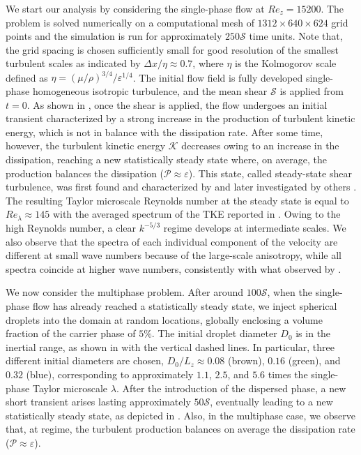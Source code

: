 We start our analysis by considering the single-phase flow at $Re_z = 15200$. The problem is solved numerically on a computational mesh of $1312 \times 640 \times 624$ grid points and the simulation is run for approximately $250\mathcal{S}$ time units. Note that, the grid spacing is chosen sufficiently small for good resolution of the smallest turbulent scales as indicated by $\Delta x / \eta \approx 0.7$, where $\eta$ is the Kolmogorov scale defined as $\eta=\left( \mu/\rho \right)^{3/4}/\varepsilon^{1/4}$. The initial flow field is  fully developed single-phase homogeneous isotropic turbulence, and the mean shear $\mathcal{S}$ is applied from $t=0$. As shown in , once the shear is applied, the flow undergoes an initial transient characterized by a strong increase in the production of turbulent kinetic energy, which is not in balance with the dissipation rate. After some time, however, the turbulent kinetic energy $\mathcal{K}$ decreases owing to an increase in the dissipation, reaching a new statistically steady state where, on average, the production balances the dissipation ($\mathcal{P} \approx \varepsilon$). This state, called steady-state shear turbulence, was first found and characterized by \cite{pumir_1996a} and later investigated by others \citep[e.g.][]{sekimoto_dong_jimenez_2016a}. The resulting Taylor microscale Reynolds number at the steady state is equal to $Re_\lambda \approx 145$ with the averaged spectrum of the TKE reported in . Owing to the high Reynolds number, a clear $k^{-5/3}$ regime develops at intermediate scales. We also observe that the spectra of each individual component of the velocity are different at small wave numbers because of the large-scale anisotropy, while all spectra coincide at higher wave numbers, consistently with what observed by \cite{pumir_1996a}.

We now consider the multiphase problem. After around $100 \mathcal{S}$, when the single-phase flow has already reached a statistically steady state, we inject spherical droplets into the domain at random locations, globally enclosing a volume fraction of the carrier phase of $5\%$. The initial droplet diameter $D_0$ is in the inertial range, as shown in  with the vertical dashed lines. In particular, three different initial diameters are chosen, $D_0/L_z \approx 0.08$ (brown), $0.16$ (green), and $0.32$ (blue), corresponding to approximately $1.1$, $2.5$, and $5.6$ times the single-phase Taylor microscale $\lambda$. After the introduction of the dispersed phase, a new short transient arises lasting approximately $50\mathcal{S}$, eventually leading to a new statistically steady state, as depicted in . Also, in the multiphase case, we observe that, at regime, the turbulent production balances on average the dissipation rate ($\mathcal{P} \approx \varepsilon$).

